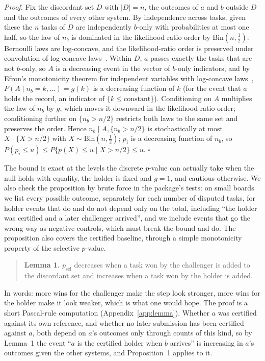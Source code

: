 \documentclass[11pt]{article}
\begin{document}
\emph{Proof.}
Fix the discordant set $D$ with $|D|=n$, the outcomes of $a$ and $b$ outside $D$ and the outcomes of every other system.
By independence across tasks, given these the $n$ tasks of $D$ are independently $b$-only with probabilities at most one half, so the law of $n_b$ is dominated in the likelihood-ratio order by $\mathrm{Bin}(n,\tfrac12)$: Bernoulli laws are log-concave, and the likelihood-ratio order is preserved under convolution of log-concave laws~\citep[Section~1.C]{shaked2007stochastic}.
Within $D$, $a$ passes exactly the tasks that are not $b$-only, so $A$ is a decreasing event in the vector of $b$-only indicators, and by Efron's monotonicity theorem for independent variables with log-concave laws~\citep{efron1965polya}, $P(A\mid n_b=k,\dots)=g(k)$ is a decreasing function of $k$ (for the event that $a$ holds the record, an indicator of $\{k\le\text{constant}\}$).
Conditioning on $A$ multiplies the law of $n_b$ by $g$, which moves it downward in the likelihood-ratio order; conditioning further on $\{n_b>n/2\}$ restricts both laws to the same set and preserves the order.
Hence $n_b\mid A,\{n_b>n/2\}$ is stochastically at most $X\mid\{X>n/2\}$ with $X\sim\mathrm{Bin}(n,\tfrac12)$; $p_i$ is a decreasing function of $n_b$, so $P(p_i\le u)\le P\{p(X)\le u\mid X>n/2\}\le u$. $\square$

The bound is exact at the levels the discrete $p$-value can actually take when the null holds with equality, the holder is fixed and $g=1$, and cautious otherwise.
We also check the proposition by brute force in the package's tests: on small boards we list every possible outcome, separately for each number of disputed tasks, for holder events that do and do not depend only on the total, including ``the holder was certified and a later challenger arrived'', and we include events that go the wrong way as negative controls, which must break the bound and do.
The proposition also covers the certified baseline, through a simple monotonicity property of the selective $p$-value.

\begin{quote}
\textbf{Lemma 1.}
$p_{\mathrm{sel}}$ decreases when a task won by the challenger is added to the discordant set and increases when a task won by the holder is added.
\end{quote}
In words: more wins for the challenger make the step look stronger, more wins for the holder make it look weaker, which is what one would hope.
The proof is a short Pascal-rule computation (Appendix~\ref{app:lemma}).
Whether $a$ was certified against its own reference, and whether no later submission has been certified against $a$, both depend on $a$'s outcomes only through counts of this kind, so by Lemma~1 the event ``$a$ is the certified holder when $b$ arrives'' is increasing in $a$'s outcomes given the other systems, and Proposition~1 applies to it.
\end{document}
